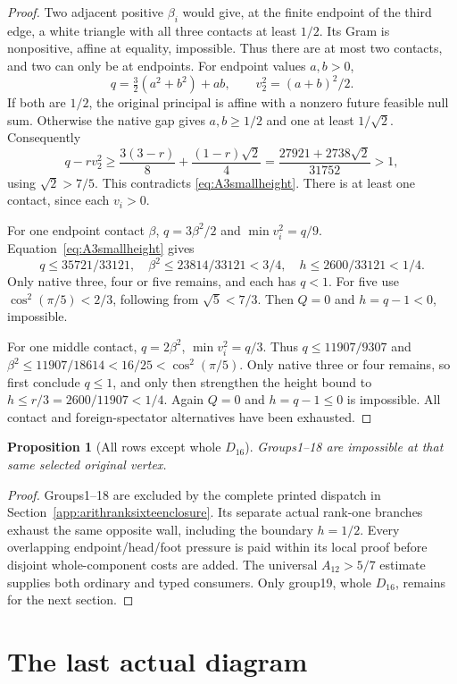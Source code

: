 \documentclass[11pt]{article}
\newtheorem{proposition}[theorem]{Proposition}
\begin{document}
\begin{proof}
Two adjacent positive $\beta_i$ would give, at the finite endpoint
of the third edge, a white triangle with all three contacts at least
$1/2$. Its Gram is nonpositive, affine at equality, impossible.
Thus there are at most two contacts, and two can only be at endpoints.
For endpoint values $a,b>0$,
\[
q=\tfrac32(a^2+b^2)+ab,\qquad v_2^2=(a+b)^2/2.
\]
If both are $1/2$, the original principal is affine with a nonzero
future feasible null sum. Otherwise the native gap gives $a,b\ge1/2$
and one at least $1/\sqrt2$. Consequently
\[
q-rv_2^2\ge\frac{3(3-r)}8+\frac{(1-r)\sqrt2}4
 =\frac{27921+2738\sqrt2}{31752}>1,
\]
using $\sqrt2>7/5$. This contradicts \eqref{eq:A3smallheight}.
There is at least one contact, since each $v_i>0$.

For one endpoint contact $\beta$, $q=3\beta^2/2$ and
$\min v_i^2=q/9$. Equation~\eqref{eq:A3smallheight} gives
\[
 q\le35721/33121,\quad \beta^2\le23814/33121<3/4,
 \quad h\le2600/33121<1/4.
\]
Only native three, four or five remains, and each has $q<1$.
For five use $\cos^2(\pi/5)<2/3$, following from $\sqrt5<7/3$.
Then $Q=0$ and $h=q-1<0$, impossible.

For one middle contact, $q=2\beta^2$, $\min v_i^2=q/3$.
Thus $q\le11907/9307$ and
$\beta^2\le11907/18614<16/25<\cos^2(\pi/5)$.
Only native three or four remains, so first conclude $q\le1$,
and only then strengthen the height bound to
$h\le r/3=2600/11907<1/4$.
Again $Q=0$ and $h=q-1\le0$ is impossible. All contact and
foreign-spectator alternatives have been exhausted.
\end{proof}

\begin{proposition}[All rows except whole $D_{16}$]\label{prop:onlyd16}
Groups1--18 are impossible at that same selected original vertex.
\end{proposition}
\begin{proof}
Groups1--18 are excluded by the complete printed dispatch in
Section~\ref{app:arithranksixteenclosure}. Its separate actual rank-one
branches exhaust the same opposite wall, including the boundary $h=1/2$.
Every overlapping endpoint/head/foot pressure is paid within its local
proof before disjoint whole-component costs are added. The universal
$A_{12}>5/7$ estimate supplies both ordinary and typed consumers.
Only group19, whole $D_{16}$, remains for the next section.
\end{proof}

\section{The last actual diagram}\label{sec:d16}
\end{document}
